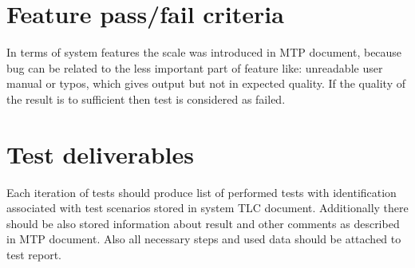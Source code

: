 \section{Feature pass/fail criteria} \label{s:details-of-the-level-test-design:feature-pass-fail-criteria}
	\begin{comment}
		Specify the criteria to be used to determine whether the feature or feature combination has passed or
		failed. This is commonly based on the number of anomalies found in each severity category(s). This
		section is not needed if it is covered by an MTP and there have been no subsequent changes to the
		criteria.
	\end{comment}
	In terms of system features the scale was introduced in \gls{MTP} document, because bug can be related to the less important part of feature like: unreadable user manual or typos, which gives output but not in expected quality. If the quality of the result is to sufficient then test is considered as failed. 
\section{Test deliverables} \label{s:details-of-the-level-test-design:test-deliverables}
	\begin{comment}
		Identify all information that is to be delivered by the test activity (documents, data, etc.). The following
		documents may be included:
		⎯ Level Test Plan(s)
		⎯ Level Test Design(s)
		⎯ Level Test Cases
		⎯ Level Test Procedures
		⎯ Level Test Logs
		⎯ Anomaly Reports
		⎯ Level Interim Test Status Report(s)
		⎯ Level Test Report(s)
		⎯ Master Test Report
		Test input data and test output data may be identified as deliverables. Test tools may also be included.
		If documents have been combined or eliminated, then this list will be modified accordingly.
		Describe the process of delivering the completed information to the individuals (preferably by position,
		not name) and organizational entities that will need it. This may be a reference to a Configuration
		Management Plan. This delivery process description is not required if it is covered by the MTP and
		there are no changes
	\end{comment}
	Each iteration of tests should produce list of performed tests with identification associated with test scenarios stored in system \gls{TLC} document. Additionally there should be also stored information about result and other comments as described in \gls{MTP} document. Also all necessary steps and used data should be attached to test report.